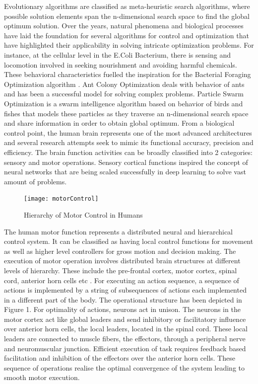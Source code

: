 \documentclass[a4paper,twoside]{article}
\begin{document}
Evolutionary algorithms are classified as meta-heuristic search algorithms, where possible solution elements span the n-dimensional search space to find the global optimum solution. Over the years, natural phenomena and biological processes have laid the foundation for several algorithms for control and optimization that have highlighted their applicability in solving intricate optimization problems. For instance, at the cellular level in the E.Coli Bacterium, there is sensing and locomotion involved in seeking nourishment and avoiding harmful chemicals. These behavioral characteristics fuelled the inspiration for the Bacterial Foraging Optimization algorithm \cite{passino2002biomimicry}\cite{onwubolu2013new}. Ant Colony Optimization \cite{dorigo2010ant} deals with behavior of ants and has been a successful model for solving complex problems. Particle Swarm Optimization \cite{kennedy2011particle} is a swarm intelligence algorithm based on behavior of birds and fishes that models these particles as they traverse an n-dimensional search space and share information in order to obtain global optimum.
From a biological control point, the human brain represents one of the most advanced architectures and several research attempts seek to mimic its functional accuracy, precision and efficiency. The brain function activities can be broadly classified into 2 categories: sensory and motor operations. Sensory cortical functions inspired the concept of neural networks that are being scaled successfully in deep learning to solve vast amount of problems.

\begin{figure}[h!]
  \texttt{[image: motorControl]}
  \caption{Hierarchy of Motor Control in Humans}
  \label{fig:motorControl}
\end{figure}

The human motor function represents a distributed neural and hierarchical control system. It can be classified as having local control functions for movement as well as higher level controllers for gross motion and decision making. The execution of motor operation involves distributed brain structures at different levels of hierarchy. These include the pre-frontal cortex, motor cortex, spinal cord, anterior horn cells etc \cite{Shaw1982119}. For executing an action sequence, a sequence of actions is implemented by a string of subsequences of actions each implemented in a different part of the body. The operational structure has been depicted in Figure 1\cite{passino2005biomimicry}.
For optimality of actions, neurons act in unison. The neurons in the motor cortex act like global leaders and send inhibitory or facilitatory influence over anterior horn cells, the local leaders, located in the spinal cord\cite{Shaw1982119}. These local leaders are connected to muscle fibers, the effectors, through a peripheral nerve and neuromuscular junction.
Efficient execution of task requires feedback based facilitation and inhibition of the effectors over the anterior horn cells. These sequence of operations realise the optimal convergence of the system leading to smooth motor execution.
\end{document}
